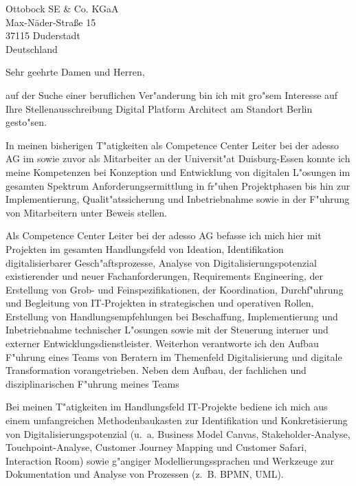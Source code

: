 \documentclass[11pt,a4paper]{dinbrief}
\date{\today}
\begin{document}
 
\begin{letter}  
{%
	Ottobock SE \& Co. KGaA\\
	Max-Näder-Straße 15\\
	37115 Duderstadt\\
	Deutschland
}
\subject{\bf Bewerbung Digital Platform Architect}
\opening{Sehr geehrte Damen und Herren,}
auf der Suche einer beruflichen Ver"anderung bin ich mit gro"sem Interesse auf Ihre Stellenausschreibung Digital Platform Architect am Standort Berlin  gesto"sen. 

In meinen bisherigen T"atigkeiten als Competence Center Leiter bei der adesso AG im sowie zuvor als Mitarbeiter an der Universit"at Duisburg-Essen konnte ich meine Kompetenzen bei Konzeption und Entwicklung von digitalen L"osungen im gesamten Spektrum Anforderungsermittlung in fr"uhen Projektphasen bis hin zur Implementierung, Qualit"atssicherung und Inbetriebnahme sowie in der F"uhrung von Mitarbeitern unter Beweis stellen.


Als Competence Center Leiter bei der adesso AG befasse ich mich hier mit Projekten im gesamten Handlungsfeld von Ideation, Identifikation digitalisierbarer Gesch"aftsprozesse, Analyse von Digitalisierungspotenzial existierender und neuer Fachanforderungen, Requirements Engineering, der Erstellung von Grob- und Feinspezifikationen, der Koordination, Durchf"uhrung und Begleitung von IT-Projekten in strategischen und operativen Rollen, Erstellung von Handlungsempfehlungen bei Beschaffung, Implementierung und Inbetriebnahme technischer L"osungen sowie mit der Steuerung interner und externer Entwicklungsdienstleister. Weiterhon verantworte ich den Aufbau F"uhrung eines Teams von Beratern im Themenfeld Digitalisierung und digitale Transformation vorangetrieben. Neben dem Aufbau, der fachlichen und disziplinarischen F"uhrung meines Teams 

Bei meinen T"atigkeiten im Handlungsfeld IT-Projekte bediene ich mich aus einem umfangreichen Methodenbaukasten zur Identifikation und Konkretisierung von Digitalisierungspotenzial (u.~a. Business Model Canvas, Stakeholder-Analyse, Touchpoint-Analyse, Customer Journey Mapping und Customer Safari, Interaction Room) sowie g"angiger Modellierungssprachen und Werkzeuge zur Dokumentation und Analyse von Prozessen (z.~B. BPMN, UML).


\end{letter}
\end{document}
